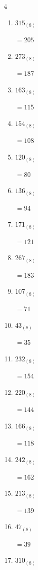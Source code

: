 \begin{multicols}{4}
\begin{enumerate}
  \item $315_{(8)}$

        $=205$

  \item $273_{(8)}$

        $=187$

  \item $163_{(8)}$

        $=115$

  \item $154_{(8)}$

        $=108$

  \item $120_{(8)}$

        $=80$

  \item $136_{(8)}$

        $=94$

  \item $171_{(8)}$

        $=121$

  \item $267_{(8)}$

        $=183$

  \item $107_{(8)}$

        $=71$

  \item $43_{(8)}$

        $=35$

  \item $232_{(8)}$

        $=154$

  \item $220_{(8)}$

        $=144$

  \item $166_{(8)}$

        $=118$

\columnbreak %

  \item $242_{(8)}$

        $=162$

  \item $213_{(8)}$

        $=139$

  \item $47_{(8)}$

        $=39$

  \item $310_{(8)}$


\end{enumerate}
\end{multicols}
